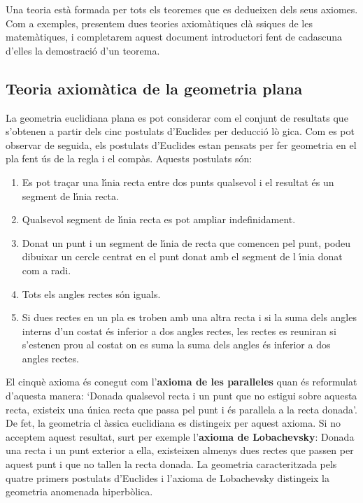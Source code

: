 \bigskip

Una teoria est\`{a} formada per tots els teoremes que es dedueixen dels seus
axiomes. Com a exemples, presentem dues teories axiom\`{a}tiques cl\`{a}%
ssiques de les matem\`{a}tiques, i completarem aquest document introductori
fent de cadascuna d'elles la demostraci\'{o} d'un teorema.

\subsection{Teoria axiom\`{a}tica de la geometria plana}

La geometria euclidiana plana es pot considerar com el conjunt de resultats
que s'obtenen a partir dels cinc postulats d'Euclides per deducci\'{o} l\`{o}%
gica. Com es pot observar de seguida, els postulats d'Euclides estan pensats
per fer geometria en el pla fent \'{u}s de la regla i el comp\`{a}s. Aquests
postulats s\'{o}n:

\begin{enumerate}
\item Es pot tra\c{c}ar una l\'{\i}nia recta entre dos punts qualsevol i el
resultat \'{e}s un segment de l\'{\i}nia recta.

\item Qualsevol segment de l\'{\i}nia recta es pot ampliar indefinidament.

\item Donat un punt i un segment de l\'{\i}nia de recta que comencen pel
punt, podeu dibuixar un cercle centrat en el punt donat amb el segment de l%
\'{\i}nia donat com a radi.

\item Tots els angles rectes s\'{o}n iguals.

\item Si dues rectes en un pla es troben amb una altra recta i si la suma
dels angles interns d'un costat \'{e}s inferior a dos angles rectes, les
rectes es reuniran si s'estenen prou al costat on es suma la suma dels
angles \'{e}s inferior a dos angles rectes.
\end{enumerate}

El cinqu\`{e} axioma \'{e}s conegut com l'\textbf{axioma de les
paral\textperiodcentered leles} quan \'{e}s reformulat d'aquesta manera:
`Donada qualsevol recta i un punt que no estigui sobre aquesta recta,
existeix una \'{u}nica recta que passa pel punt i \'{e}s
paral\textperiodcentered lela a la recta donada'. De fet, la geometria cl%
\`{a}ssica euclidiana es distingeix per aquest axioma. Si no acceptem aquest
resultat, surt per exemple l'\textbf{axioma de Lobachevsky}: Donada una
recta i un punt exterior a ella, existeixen almenys dues rectes que passen
per aquest punt i que no tallen la recta donada. La geometria caracteritzada
pels quatre primers postulats d'Euclides i l'axioma de Lobachevsky
distingeix la geometria anomenada hiperb\`{o}lica.

